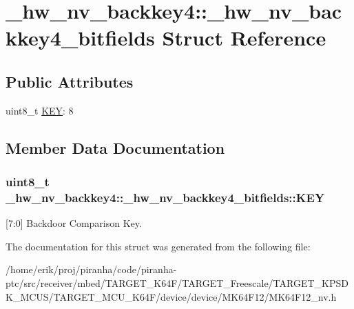 \hypertarget{struct__hw__nv__backkey4_1_1__hw__nv__backkey4__bitfields}{}\section{\+\_\+hw\+\_\+nv\+\_\+backkey4\+:\+:\+\_\+hw\+\_\+nv\+\_\+backkey4\+\_\+bitfields Struct Reference}
\label{struct__hw__nv__backkey4_1_1__hw__nv__backkey4__bitfields}
\subsection*{Public Attributes}
\begin{DoxyCompactItemize}
\item 
uint8\+\_\+t \hyperlink{struct__hw__nv__backkey4_1_1__hw__nv__backkey4__bitfields_aca163ca07de8545960e44c947ac184ac}{K\+EY}\+: 8
\end{DoxyCompactItemize}


\subsection{Member Data Documentation}
\subsubsection[{\texorpdfstring{K\+EY}{KEY}}]{\setlength{\rightskip}{0pt plus 5cm}uint8\+\_\+t \+\_\+hw\+\_\+nv\+\_\+backkey4\+::\+\_\+hw\+\_\+nv\+\_\+backkey4\+\_\+bitfields\+::\+K\+EY}\hypertarget{struct__hw__nv__backkey4_1_1__hw__nv__backkey4__bitfields_aca163ca07de8545960e44c947ac184ac}{}\label{struct__hw__nv__backkey4_1_1__hw__nv__backkey4__bitfields_aca163ca07de8545960e44c947ac184ac}
\mbox{[}7\+:0\mbox{]} Backdoor Comparison Key. 

The documentation for this struct was generated from the following file\+:\begin{DoxyCompactItemize}
\item 
/home/erik/proj/piranha/code/piranha-\/ptc/src/receiver/mbed/\+T\+A\+R\+G\+E\+T\+\_\+\+K64\+F/\+T\+A\+R\+G\+E\+T\+\_\+\+Freescale/\+T\+A\+R\+G\+E\+T\+\_\+\+K\+P\+S\+D\+K\+\_\+\+M\+C\+U\+S/\+T\+A\+R\+G\+E\+T\+\_\+\+M\+C\+U\+\_\+\+K64\+F/device/device/\+M\+K64\+F12/M\+K64\+F12\+\_\+nv.\+h\end{DoxyCompactItemize}
